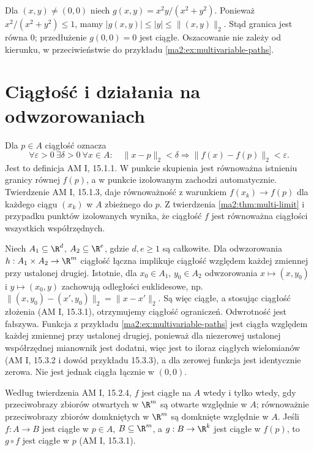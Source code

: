 \begin{przyklad}
Dla $(x,y)\ne(0,0)$ niech $g(x,y)=x^2y/(x^2+y^2)$.
Ponieważ $x^2/(x^2+y^2)\le1$, mamy
$|g(x,y)|\le |y|\le\|(x,y)\|_2$.
Stąd granica jest równa $0$; przedłużenie $g(0,0)=0$
jest ciągłe. Oszacowanie nie zależy od kierunku,
w przeciwieństwie do przykładu \ref{ma2:ex:multivariable-paths}.
\end{przyklad}

\section{Ciągłość i działania na odwzorowaniach}

Dla $p\in A$ ciągłość oznacza
\[
 \forall\varepsilon>0\ \exists\delta>0\ \forall x\in A:
 \quad\|x-p\|_2<\delta\Longrightarrow
 \|f(x)-f(p)\|_2<\varepsilon.
\]
Jest to definicja AM I, 15.1.1. W punkcie skupienia
jest równoważna istnieniu granicy równej $f(p)$,
a w punkcie izolowanym zachodzi automatycznie.
Twierdzenie AM I, 15.1.3, daje równoważność z warunkiem
$f(x_k)\to f(p)$ dla każdego ciągu $(x_k)$ w $A$
zbieżnego do $p$. Z twierdzenia \ref{ma2:thm:multi-limit}
i przypadku punktów izolowanych wynika, że ciągłość
$f$ jest równoważna ciągłości wszystkich współrzędnych.

\begin{przyklad}
\label{ma2:ex:separate-continuity}
Niech $A_1\subseteq\R^d$, $A_2\subseteq\R^e$,
gdzie $d,e\ge1$ są całkowite. Dla odwzorowania
$h:A_1\times A_2\to\R^m$ ciągłość łączna implikuje
ciągłość względem każdej zmiennej przy ustalonej drugiej.
Istotnie, dla $x_0\in A_1$, $y_0\in A_2$ odwzorowania
$x\mapsto(x,y_0)$ i $y\mapsto(x_0,y)$ zachowują
odległości euklidesowe, np.
$\|(x,y_0)-(x',y_0)\|_2=\|x-x'\|_2$.
Są więc ciągłe, a stosując ciągłość złożenia
(AM I, 15.3.1), otrzymujemy ciągłość ograniczeń.
Odwrotność jest fałszywa. Funkcja z przykładu
\ref{ma2:ex:multivariable-paths} jest ciągła względem
każdej zmiennej przy ustalonej drugiej, ponieważ dla
niezerowej ustalonej współrzędnej mianownik jest
dodatni, więc jest to iloraz ciągłych wielomianów
(AM I, 15.3.2 i dowód przykładu 15.3.3),
a dla zerowej funkcja jest identycznie zerowa.
Nie jest jednak ciągła łącznie w $(0,0)$.
\end{przyklad}

Według twierdzenia AM I, 15.2.4, $f$ jest ciągłe na $A$
wtedy i tylko wtedy, gdy przeciwobrazy zbiorów otwartych
w $\R^m$ są otwarte względnie w $A$; równoważnie
przeciwobrazy zbiorów domkniętych w $\R^m$ są domknięte
względnie w $A$. Jeśli $f:A\to B$ jest ciągłe w $p\in A$,
$B\subseteq\R^m$, a $g:B\to\R^k$ jest ciągłe w $f(p)$,
to $g\circ f$ jest ciągłe w $p$ (AM I, 15.3.1).


